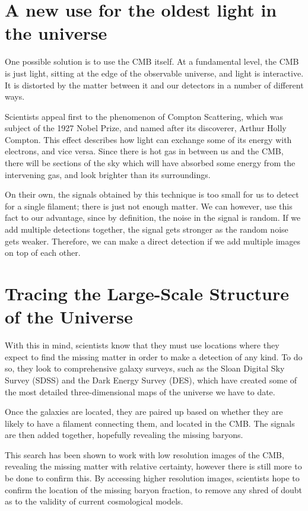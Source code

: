 \documentclass{article}
\begin{document}
\section{A new use for the oldest light in the universe}

One possible solution is to use the CMB itself. At a fundamental level, the CMB is just light, sitting at the edge of the observable universe, and light is interactive. It is distorted by the matter between it and our detectors in a number of different ways.

Scientists appeal first to the phenomenon of Compton Scattering, which was subject of the 1927 Nobel Prize, and named after its discoverer, Arthur Holly Compton. This effect describes how light can exchange some of its energy with electrons, and vice versa. Since there is hot gas in between us and the CMB, there will be sections of the sky which will have absorbed some energy from the intervening gas, and look brighter than its surroundings. 

On their own, the signals obtained by this technique is too small for us to detect for a single filament; there is just not enough matter. We can however, use this fact to our advantage, since by definition, the noise in the signal is random. If we add multiple detections together, the signal gets stronger as the random noise gets weaker. Therefore, we can make a direct detection if we add multiple images on top of each other.

\section{Tracing the Large-Scale Structure of the Universe}

With this in mind, scientists know that they must use locations where they expect to find the missing matter in order to make a detection of any kind. To do so, they look to comprehensive galaxy surveys, such as the Sloan Digital Sky Survey (SDSS) and the Dark Energy Survey (DES), which have created some of the most detailed three-dimensional maps of the universe we have to date.

Once the galaxies are located, they are paired up based on whether they are likely to have a filament connecting them, and located in the CMB. The signals are then added together, hopefully revealing the missing baryons.

This search has been shown to work with low resolution images of the CMB, revealing the missing matter with relative certainty, however there is still more to be done to confirm this. By accessing higher resolution images, scientists hope to confirm the location of the missing baryon fraction, to remove any shred of doubt as to the validity of current cosmological models.

%
%
\end{document}
